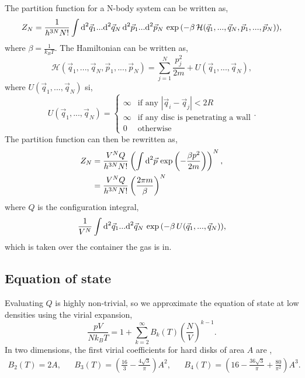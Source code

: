 \documentclass{article}
\newcommand{\diff}{\textnormal{d}}
\begin{document}
The partition function for a N-body system can be written as,
\begin{equation}
    Z_N
    =
    \frac{1}{h^{3N} N!}
    \int \diff^2 \vec{q}_1 ... \diff^2 \vec{q}_N \, \diff^2 \vec{p}_1 ... \diff^2 \vec{p}_N \,
    \exp{\left(
        - \beta \, \mathcal{H}(\vec{q}_1,..., \vec{q}_N, \vec{p}_1, ..., \vec{p}_N)
    \right)},
\end{equation}
where $\beta = \frac{1}{k_B T}$. The Hamiltonian can be written as,
\begin{equation}
    \mathcal{H}(\vec{q}_1,..., \vec{q}_N, \vec{p}_1, ..., \vec{p}_N)
    =
    \sum_{j=1}^N \frac{p_j^2}{2m}
    +
    U(\vec{q}_1,..., \vec{q}_N),
\end{equation}
where $U(\vec{q}_1,..., \vec{q}_N)$ si,
\begin{equation}
    U(\vec{q}_1,..., \vec{q}_N)
    =
    \begin{cases}
       \infty & \text{if any } |\vec{q}_i - \vec{q}_j|< 2 R \\
       \infty & \text{if any disc is penetrating a wall} \\
       0 & \text{otherwise}
    \end{cases}.
\end{equation}
The partition function can then be rewritten as,
\begin{align}
\label{eq:partition_function_simplified}
    Z_N
    &=
    \frac{V^N Q}{h^{3N} N!}
    \left(
        \int \diff^2 \vec{p} \, \exp{
        \left(- \frac{\beta p^2}{2m} \right)}
    \right)^N, \\
    &=
    \frac{V^N Q}{h^{3N} N!}
    \left(
        \frac{2 \pi m}{\beta}
    \right)^N
\end{align}
where $Q$ is the configuration integral,
\begin{equation}
\label{eq:configuration_integral}
    \frac{1}{V^N}\int \diff^2 \vec{q}_1 ... \diff^2 \vec{q}_N \,
    \exp{\left( -\beta \, U(\vec{q}_1, ..., \vec{q}_N) \right)},
\end{equation}
which is taken over the container the gas is in. 

\subsection{Equation of state}
Evaluating $Q$ is highly non-trivial, so we approximate the equation of state at low densities using the virial expansion,
\begin{equation}
    \frac{pV}{N k_B T}
    =
    1
    +
    \sum_{k=2}^\infty B_k(T) \left( \frac{N}{V} \right)^{k-1}.
\end{equation}
In two dimensions, the first virial coefficients for hard disks of area $A$ are \cite{virial-coeff},
\begin{align}
    B_2(T) = 2A,
    &&
    B_3(T) = \left( \frac{16}{3} - \frac{4 \sqrt{3}}{\pi} \right) A^2,
    &&
    B_4(T) = \left( 16 - \frac{36 \sqrt{3}}{\pi} + \frac{80}{\pi^2} \right) A^3.
\end{align}
\end{document}
